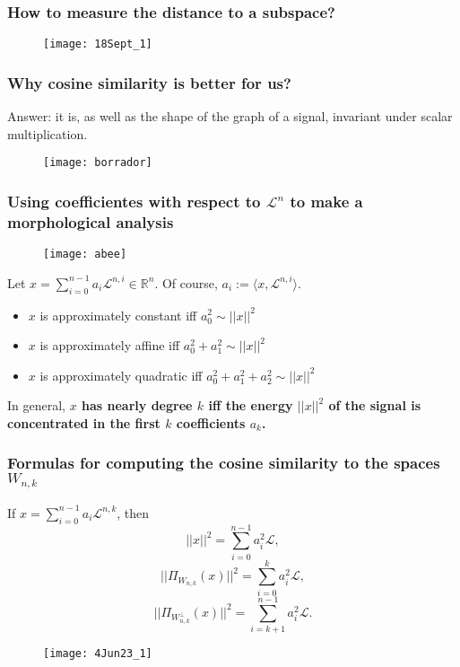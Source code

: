 \documentclass[]{beamer}
\theoremstyle{definition}
\newcommand{\IR}{\mathbb{R}}
\newcommand{\suma}[3]{\sum\limits_{#1}^{#2}#3} %
\newcommand{\cali}[1]{\mathcal{#1}} %
\begin{document}
\begin{frame}
\frametitle{How to measure the distance to a subspace?}
\begin{figure}[h]
\texttt{[image: 18Sept\_1]}
\end{figure}
\end{frame}

\begin{frame}
\frametitle{Why cosine similarity is better for us?}
Answer: it is, as well as the
shape of the graph of a signal, 
invariant under scalar multiplication.

\begin{figure}[h]
\texttt{[image: borrador]}
\end{figure}
\end{frame}


\begin{frame}
\frametitle{Using coefficientes with respect to $\cali{L}^{n}$ to make a morphological analysis}
\begin{figure}[h]
\texttt{[image: abee]}
\end{figure}
\end{frame}



\begin{frame}
Let $x = \suma{i=0}{n-1}{a_{i}\cali{L}^{n,i}} \in \IR^{n}$.
Of course, $a_{i} := \langle x, \cali{L}^{n,i} \rangle$.
\begin{itemize}
	\item $x$ is approximately constant iff $a_{0}^{2} \sim ||x||^{2}$ 
	\item $x$ is approximately affine iff $a_{0}^{2} + a_{1}^{2} \sim ||x||^{2}$ 
	\item $x$ is approximately quadratic iff $a_{0}^{2} + a_{1}^{2} + a_{2}^{2} \sim ||x||^{2}$ 
\end{itemize}

In general, \textbf{$x$ has nearly degree $k$ iff the energy 
$||x||^{2}$ of the signal
is concentrated in the first $k$ coefficients $a_{k}$.}
\end{frame}



\begin{frame}
\frametitle{Formulas for computing the cosine similarity to the spaces $W_{n,k}$}
\begin{minipage}{0.5\textwidth}
If $x = \suma{i=0}{n-1}{a_{i} \cali{L}^{n,k}}$, then
\[
||x||^{2} = \suma{i=0}{n-1}{a_{i}^{2} \cali{L}},
\]
\[
||\Pi_{W_{n,k}}(x)||^{2} = \suma{i=0}{k}{a_{i}^{2} \cali{L}},
\]
\[
||\Pi_{W_{n,k}^{\perp}}(x)||^{2} = \suma{i=k+1}{n-1}{a_{i}^{2} \cali{L}}.
\]

\end{minipage} \hfill
\begin{minipage}{0.45\textwidth}

\begin{figure}[h]
\texttt{[image: 4Jun23\_1]}
\end{figure}

\end{minipage}
\end{frame}
\end{document}

